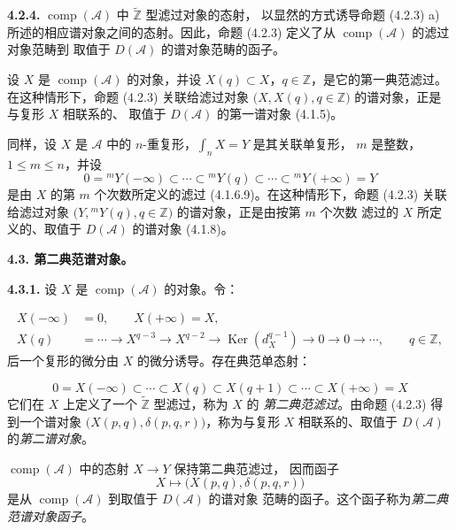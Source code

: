 \clearpage
{}%
\begingroup\small\setlength{\parskip}{0pt}\setlength{\emergencystretch}{1.5em}
\setlength{\abovedisplayskip}{4pt plus 2pt minus 2pt}%
\setlength{\belowdisplayskip}{4pt plus 2pt minus 2pt}%

\noindent\textbf{4.2.4.}\quad
$\operatorname{comp}(\mathcal A)$ 中 $\widetilde{\mathbb Z}$ 型滤过对象的态射，
以显然的方式诱导命题 (4.2.3) a) 所述的相应谱对象之间的态射。因此，命题
(4.2.3) 定义了从 $\operatorname{comp}(\mathcal A)$ 的滤过对象范畴到
取值于 $D(\mathcal A)$ 的谱对象范畴的函子。

设 $X$ 是 $\operatorname{comp}(\mathcal A)$ 的对象，并设
$X(q)\subset X$，$q\in\mathbb Z$，是它的第一典范滤过。
在这种情形下，命题 (4.2.3) 关联给滤过对象
$\bigl(X,X(q),q\in\mathbb Z\bigr)$ 的谱对象，正是与复形 $X$ 相联系的、
取值于 $D(\mathcal A)$ 的第一谱对象 (4.1.5)。

同样，设 $X$ 是 $\mathcal A$ 中的 $n$-重复形，$\int_n X=Y$ 是其关联单复形，
$m$ 是整数，$1\leq m\leq n$，并设
\[
0={}^{m}\!Y(-\infty)\subset\cdots\subset{}^{m}\!Y(q)
\subset\cdots\subset{}^{m}\!Y(+\infty)=Y
\]
是由 $X$ 的第 $m$ 个次数所定义的滤过 (4.1.6.9)。在这种情形下，命题
(4.2.3) 关联给滤过对象
$\bigl(Y,{}^{m}\!Y(q),q\in\mathbb Z\bigr)$ 的谱对象，正是由按第 $m$ 个次数
滤过的 $X$ 所定义的、取值于 $D(\mathcal A)$ 的谱对象 (4.1.8)。

\medskip\noindent\textbf{4.3. 第二典范谱对象。}

\noindent\textbf{4.3.1.}\quad
设 $X$ 是 $\operatorname{comp}(\mathcal A)$ 的对象。令：

\begin{equation}
\begin{aligned}
X(-\infty)&=0,\qquad X(+\infty)=X,\\
X(q)&=\cdots\longrightarrow X^{q-3}\longrightarrow X^{q-2}
\longrightarrow\operatorname{Ker}(d_X^{q-1})
\longrightarrow0\longrightarrow0\longrightarrow\cdots,
\qquad q\in\mathbb Z,
\end{aligned}
\tag{4.3.1.1}
\end{equation}
后一个复形的微分由 $X$ 的微分诱导。存在典范单态射：

\begin{equation}
0=X(-\infty)\subset\cdots\subset X(q)\subset X(q+1)
\subset\cdots\subset X(+\infty)=X
\tag{4.3.1.2}
\end{equation}
它们在 $X$ 上定义了一个 $\widetilde{\mathbb Z}$ 型滤过，称为 $X$ 的
\emph{第二典范滤过}。由命题 (4.2.3) 得到一个谱对象
$\bigl(X(p,q),\delta(p,q,r)\bigr)$，称为与复形 $X$ 相联系的、取值于
$D(\mathcal A)$ 的\emph{第二谱对象}。

$\operatorname{comp}(\mathcal A)$ 中的态射 $X\longrightarrow Y$ 保持第二典范滤过，
因而函子
\[
X\longmapsto\bigl(X(p,q),\delta(p,q,r)\bigr)
\]
是从 $\operatorname{comp}(\mathcal A)$ 到取值于 $D(\mathcal A)$ 的谱对象
范畴的函子。这个函子称为\emph{第二典范谱对象函子}。
\endgroup

